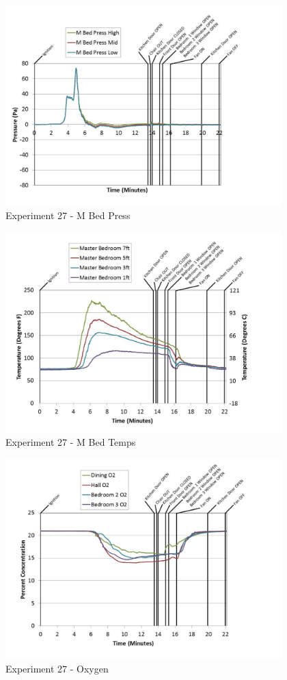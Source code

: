 \documentclass{article}
\begin{document}
\begin{appendices}
	\clearpage

	\begin{figure}[h!]
		\centering
		\includegraphics[height=3.05in]{0_Images/Results_Charts/Exp_27_Charts/MBedPress.pdf}
		\caption{Experiment 27 - M Bed Press}
	\end{figure}
 

	\begin{figure}[h!]
		\centering
		\includegraphics[height=3.05in]{0_Images/Results_Charts/Exp_27_Charts/MBedTemps.pdf}
		\caption{Experiment 27 - M Bed Temps}
	\end{figure}
 
	\clearpage

	\begin{figure}[h!]
		\centering
		\includegraphics[height=3.05in]{0_Images/Results_Charts/Exp_27_Charts/Oxygen.pdf}
		\caption{Experiment 27 - Oxygen}
	\end{figure}
 


\end{appendices}
\end{document}
